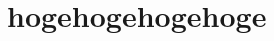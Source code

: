 \documentclass[11pt, dvipdfmx]{jreport}
\begin{document}
\chapter{hogehogehogehoge}
\label{chap:hogehogehogehoge}
\end{document}
